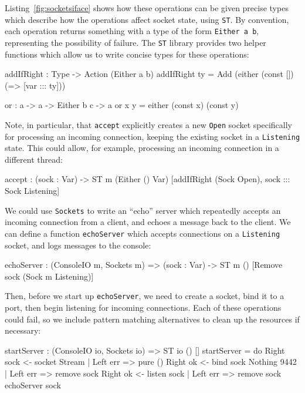 Listing~\ref{fig:socketsiface} shows how these operations can be given precise
types which describe how the operations affect socket state, using \texttt{ST}.
By convention, each operation returns something with a type of the form
\texttt{Either a b}, representing the possibility of failure.
The \texttt{ST} library provides two helper functions
which allow us to write concise types for these operations:

\small
\begin{code}
addIfRight : Type -> Action (Either a b)
addIfRight ty = Add (either (const []) (\var => [var ::: ty]))

or : a -> a -> Either b c -> a
or x y = either (const x) (const y)
\end{code}
\normalsize

Note, in particular, that \texttt{accept} explicitly creates a new
\texttt{Open} socket specifically for processing an incoming connection,
keeping the existing socket in a \texttt{Listening} state. This could allow,
for example, processing an incoming connection in a different thread:

\small
\begin{code}
accept : (sock : Var) ->
    ST m (Either () Var) [addIfRight (Sock Open), sock ::: Sock Listening]
\end{code}
\normalsize

We could use \texttt{Sockets} to write an ``echo'' server which repeatedly
accepts an incoming connection from a client, and echoes a message back to the
client. We can define a function \texttt{echoServer} which accepts connections
on a \texttt{Listening} socket, and logs messages to the console:

\small
\begin{code}
echoServer : (ConsoleIO m, Sockets m) => (sock : Var) -> 
             ST m () [Remove sock (Sock {m} Listening)]
\end{code}
\normalsize

Then, before we start up \texttt{echoServer}, we need to create a socket, bind
it to a port, then begin listening for incoming connections. Each of these
operations could fail, so we include pattern matching alternatives to clean
up the resources if necessary:

\small
\begin{code}
startServer : (ConsoleIO io, Sockets io) => ST io () [] 
startServer = do Right sock <- socket Stream        | Left err => pure () 
                 Right ok <- bind sock Nothing 9442 | Left err => remove sock
                 Right ok <- listen sock            | Left err => remove sock
                 echoServer sock
\end{code}
\normalsize

